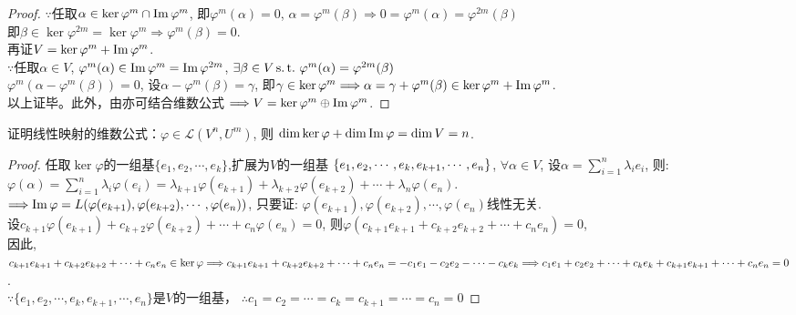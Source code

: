 \begin{proof}
  $\because$任取$\alpha \in \ker\varphi^m \cap \operatorname{Im}\varphi^m$,
  即$\varphi^m(\alpha)=0$, $\alpha = \varphi^m(\beta) \Longrightarrow
  0 = \varphi^m(\alpha) = \varphi^{2m}(\beta)$\\
  即$\beta \in \ker\varphi^{2m} = \ker\varphi^m
  \Longrightarrow \varphi^m(\beta) = 0$. \\
  再证$V = \ker\varphi^m + \operatorname{Im}\varphi^m$. \\
  $\because$任取$\alpha \in V$,
  $\varphi^m(\alpha) \in \operatorname{Im}\varphi^m = \operatorname{Im}\varphi^{2m}$,
  $\exists \beta \in V \operatorname{{}s.t.{}} \varphi^m(\alpha) = \varphi^{2m}(\beta)$ \\
  $\varphi^m(\alpha - \varphi^m(\beta))=0$,
  设$\alpha - \varphi^m(\beta) = \gamma$,
  即$\gamma \in \ker\varphi^m \Longrightarrow
  \alpha = \gamma + \varphi^m(\beta) \in \ker\varphi^m + \operatorname{Im}\varphi^m$. \\
  以上证毕。此外，由亦可结合维数公式
  $\Longrightarrow V = \ker\varphi^m \oplus \operatorname{Im}\varphi^m$.
\end{proof}

\begin{example}
  证明线性映射的维数公式：$\varphi \in \mathcal{L}(V^n,U^m)$, 则
  $\dim\ker\varphi+\dim\operatorname{Im}\varphi=\dim V = n$.
\end{example}

\begin{proof}
  任取$\ker\varphi$的一组基$\{e_1,e_2,\cdots,e_k\}$,扩展为$V$的一组基
  $\{e_1,e_2,\cdots,e_k,e_{k+1},\cdots,\\e_n\}$,
  $\forall \alpha \in V$,
  设$\alpha=\sum_{i=1}^n\lambda_ie_i$,
  则:\\
  $\varphi(\alpha)=\sum_{i=1}^n\lambda_i\varphi(e_i)
  =\lambda_{k+1}\varphi(e_{k+1})+\lambda_{k+2}\varphi(e_{k+2})+\cdots
  +\lambda_n\varphi(e_n)$.\\
  $\Longrightarrow \operatorname{Im}\varphi =
  L(\varphi(e_{k+1}),\varphi(e_{k+2}),\cdots,\varphi(e_n))$,
  只要证: $\varphi(e_{k+1}),\varphi(e_{k+2}),\cdots,\varphi(e_n)$线性无关.\\
  设$c_{k+1}\varphi(e_{k+1})+c_{k+2}\varphi(e_{k+2})+\cdots+c_n\varphi(e_n)=0$,
  则$\varphi(c_{k+1}e_{k+1}+c_{k+2}e_{k+2}+\cdots+c_ne_n)=0$,\\
  因此, $c_{k+1}e_{k+1}+c_{k+2}e_{k+2}+\cdots+c_ne_n \in \ker\varphi\\
  \Longrightarrow c_{k+1}e_{k+1}+c_{k+2}e_{k+2}+\cdots+c_ne_n =
  -c_1e_1-c_2e_2-\cdots-c_ke_k\\
  \Longrightarrow c_1e_1+c_2e_2+\cdots+c_ke_k+c_{k+1}e_{k+1}+\cdots+c_ne_n=0$.\\
  $\because \{e_1,e_2,\cdots,e_k,e_{k+1},\cdots,e_n\}$是$V$的一组基，
  $\therefore c_1=c_2=\cdots=c_k=c_{k+1}=\cdots=c_n=0$
\end{proof}

